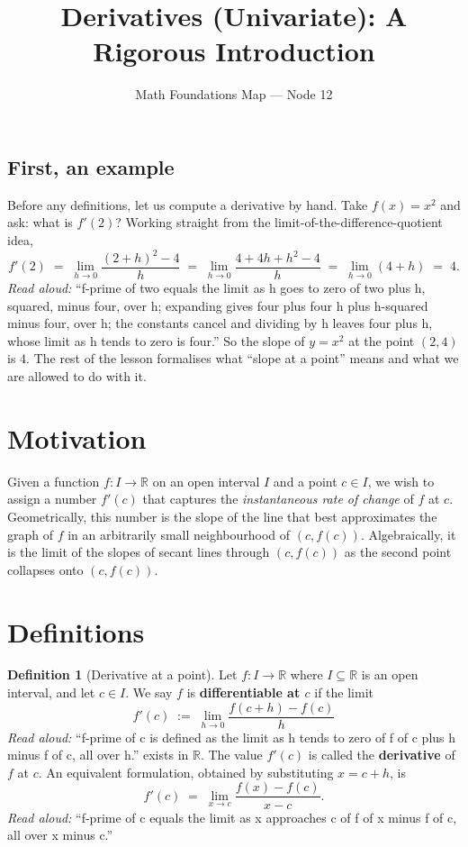 \documentclass[11pt]{article}
\title{Derivatives (Univariate): A Rigorous Introduction}
\author{Math Foundations Map --- Node 12}
\date{}
\theoremstyle{definition}
\newtheorem{definition}[theorem]{Definition}
\theoremstyle{remark}
\begin{document}
\maketitle

\subsection*{First, an example}
Before any definitions, let us compute a derivative by hand. Take
$f(x) = x^2$ and ask: what is $f'(2)$? Working straight from the
limit-of-the-difference-quotient idea,
\[
f'(2) \;=\; \lim_{h \to 0} \frac{(2+h)^2 - 4}{h}
       \;=\; \lim_{h \to 0} \frac{4 + 4h + h^2 - 4}{h}
       \;=\; \lim_{h \to 0} (4 + h)
       \;=\; 4.
\]
\emph{Read aloud:} ``f-prime of two equals the limit as h goes to zero of two plus h, squared, minus four, over h; expanding gives four plus four h plus h-squared minus four, over h; the constants cancel and dividing by h leaves four plus h, whose limit as h tends to zero is four.''
So the slope of $y = x^2$ at the point $(2, 4)$ is $4$. The rest of the
lesson formalises what ``slope at a point'' means and what we are
allowed to do with it.

\section{Motivation}

Given a function $f : I \to \mathbb{R}$ on an open interval $I$ and a point
$c \in I$, we wish to assign a number $f'(c)$ that captures the
\emph{instantaneous rate of change} of $f$ at $c$. Geometrically, this number
is the slope of the line that best approximates the graph of $f$ in an
arbitrarily small neighbourhood of $(c, f(c))$. Algebraically, it is the limit
of the slopes of secant lines through $(c, f(c))$ as the second point
collapses onto $(c, f(c))$.

\section{Definitions}

\begin{definition}[Derivative at a point]
Let $f : I \to \mathbb{R}$ where $I \subseteq \mathbb{R}$ is an open interval,
and let $c \in I$. We say $f$ is \textbf{differentiable at $c$} if the limit
\[
f'(c) \;:=\; \lim_{h \to 0} \frac{f(c+h) - f(c)}{h}
\]
\emph{Read aloud:} ``f-prime of c is defined as the limit as h tends to zero of f of c plus h minus f of c, all over h.''
exists in $\mathbb{R}$. The value $f'(c)$ is called the \textbf{derivative}
of $f$ at $c$. An equivalent formulation, obtained by substituting $x = c + h$, is
\[
f'(c) \;=\; \lim_{x \to c} \frac{f(x) - f(c)}{x - c}.
\]
\emph{Read aloud:} ``f-prime of c equals the limit as x approaches c of f of x minus f of c, all over x minus c.''
\end{definition}
\end{document}
